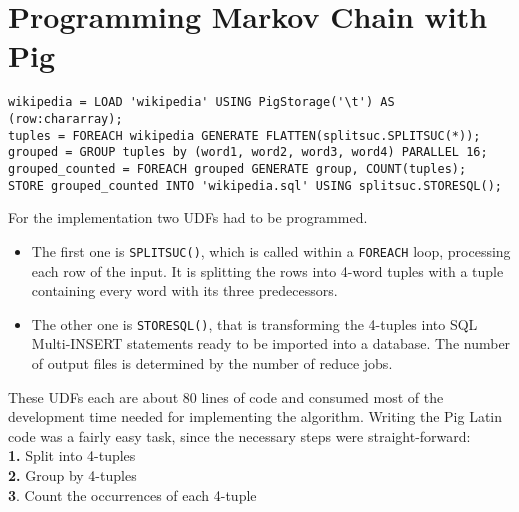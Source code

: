 \section{Programming Markov Chain with Pig}                                              
                         
\begin{lstlisting}[language=pig,caption=Markov Chain in Pig Latin,label=pigmarkovstructure,columns=fullflexible]    
wikipedia = LOAD 'wikipedia' USING PigStorage('\t') AS (row:chararray);
tuples = FOREACH wikipedia GENERATE FLATTEN(splitsuc.SPLITSUC(*));
grouped = GROUP tuples by (word1, word2, word3, word4) PARALLEL 16;
grouped_counted = FOREACH grouped GENERATE group, COUNT(tuples);
STORE grouped_counted INTO 'wikipedia.sql' USING splitsuc.STORESQL();
\end{lstlisting}                  

For the implementation two UDFs had to be programmed. 
\begin{itemize}
\item The first one is {\tt SPLITSUC()}, which is called within a {\tt FOREACH} loop, processing each row of the input. It is splitting the rows into 4-word tuples with a tuple containing every word with its three predecessors.
\item The other one is {\tt STORESQL()}, that is transforming the 4-tuples into SQL Multi-INSERT statements ready to be imported into a database. The number of output files is determined by the number of reduce jobs.
\end{itemize}

These UDFs each are about 80 lines of code and consumed most of the development time needed for implementing the algorithm. Writing the Pig Latin code was a fairly easy task, since the necessary steps were straight-forward: \\
{\bf 1.} Split into 4-tuples\\{\bf 2.} Group by 4-tuples\\{\bf 3}. Count the occurrences of each 4-tuple



